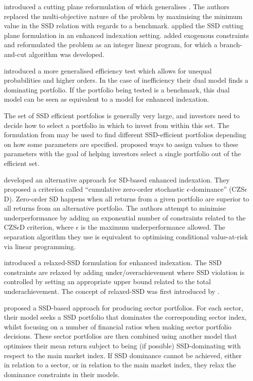 \cite{fabian2011,fabian2011b} introduced a cutting plane reformulation of \cite{roman2006} which generalises \cite{dentcheva2006}. The authors replaced the multi-objective nature of the problem by maximising the minimum value in the SSD relation with regards to a benchmark. 
\cite{roman2013} applied the SSD cutting plane formulation in an enhanced indexation setting. \cite{valle2017} added exogenous constraints and 
reformulated the problem as an integer linear program, for which a branch-and-cut algorithm was developed.

\cite{kopa2015, post2013} introduced a more generalised efficiency test which allows for unequal probabilities and higher orders. In the case of inefficiency
their dual 
model finds a dominating portfolio. If the portfolio being tested is a benchmark, this dual model can be seen as equivalent to a model for
enhanced indexation. 

The set of SSD efficient portfolios is generally very large, and investors need to decide how to select a portfolio in which to invest
from within  this set. The formulation from \cite{post2013} may be used to find different SSD-efficient portfolios depending on how some parameters are specified. \cite{hodder2015} proposed ways to assign values to these parameters with the goal of helping investors select a single portfolio out of the efficient set.


\cite{bruni2016, bruni2012} developed an alternative approach for SD-based enhanced indexation. They proposed
 a criterion called ``cumulative zero-order stochastic $\epsilon$-dominance'' (CZS$\epsilon$D). Zero-order SD happens when all returns from a given portfolio are superior to all returns from an alternative portfolio. The authors attempt to minimise underperformance by adding an exponential number of constraints related to the  CZS$\epsilon$D criterion, where $\epsilon$ is the maximum underperformance allowed. The separation algorithm they use  is equivalent to optimising conditional value-at-risk via linear programming.

\cite{sharma2017} introduced a relaxed-SSD formulation for enhanced indexation. The SSD constraints are relaxed by adding under/overachievement
where  SSD violation is controlled by setting an appropriate upper bound related to the total underachievement. The concept of relaxed-SSD was first introduced by \cite{lizyayev2012}. 

\cite{sharma2017b} proposed a SSD-based approach for producing sector portfolios. 
For each sector, their model seeks a SSD portfolio that dominates the corresponding sector index, whilst focusing on 
a number of financial ratios
when making sector portfolio decisions. These sector portfolios are then combined using another model that optimises 
their mean return subject to being  (if possible) SSD-dominating with respect to the main market index. If SSD dominance cannot be 
achieved, either in relation to a sector, or in relation to the main market index, they 
relax the dominance constraints in their models.



